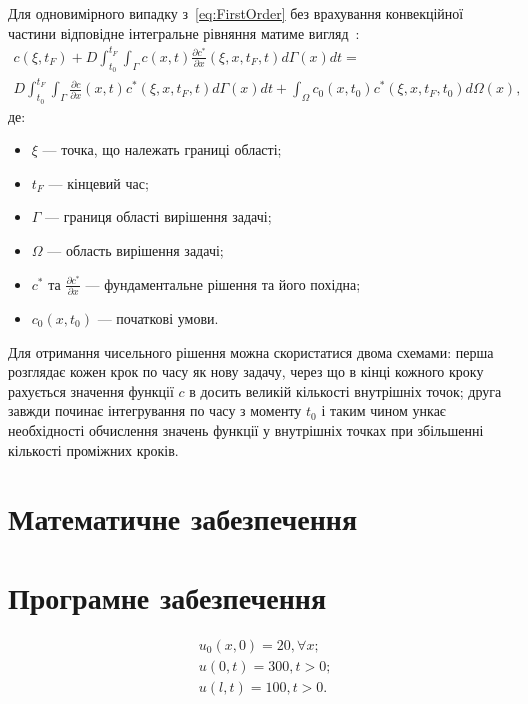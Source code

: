 \documentclass{diploma}
\begin{document}
Для одновимірного випадку з~\ref{eq:FirstOrder} без врахування конвекційної частини відповідне інтегральне рівняння матиме вигляд~\cite{Brebbia}:
\begin{equation} \label{eq:Brebbia}
	\begin{array}{l}
	c(\xi, t_F) + D \int^{t_F}_{t_0} \int_\Gamma c(x, t)\frac{\partial c^*}{\partial x}(\xi,x,t_F,t) d\Gamma(x) dt = \\
	D \int^{t_F}_{t_0} \int_\Gamma \frac{\partial c}{\partial x}(x, t)c^*(\xi,x,t_F,t) d\Gamma(x) dt + \int_\Omega c_0(x, t_0)c^*(\xi,x,t_F,t_0)d\Omega(x),
	\end{array}
\end{equation}
де:
\begin{itemize}
	\item $\xi$ --- точка, що належать границі області;
	\item $t_F$ --- кінцевий час;
	\item $\Gamma$ --- границя області вирішення задачі;
	\item $\Omega$ --- область вирішення задачі;
	\item $c^*$ та $\frac{\partial c^*}{\partial x}$ --- фундаментальне рішення та його похідна;
	\item $c_0(x, t_0)$ --- початкові умови.
\end{itemize}

Для отримання чисельного рішення можна скористатися двома схемами: перша розглядає кожен крок по часу як нову задачу, через що в кінці кожного кроку рахується значення функції $c$ в досить великій кількості внутрішніх точок; друга завжди починає інтегрування по часу з моменту $t_0$ і таким чином ункає необхідності обчислення значень функції у внутрішніх точках при збільшенні кількості проміжних кроків.

\chapter{Математичне забезпечення}


\chapter{Програмне забезпечення}
\begin{equation} \label{eq:testTask1}
	\begin{aligned}
		& u_0(x, 0) = 20, \forall x; \\
		& u (0, t) = 300, t > 0; \\
		& u (l, t) = 100, t > 0.
	\end{aligned}
\end{equation}
\end{document}
